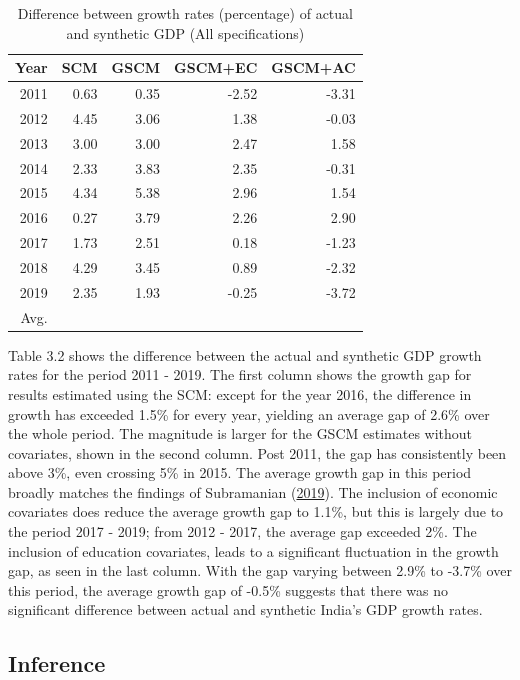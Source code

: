 \documentclass[12pt,nobind, a4paper]{reedthesis}
\begin{document}
 \newrobustcmd{\B}{\bfseries}
 \begin{table}[h!!]
 \centering
 \begin{tabular}{rrrrr}
 \hline
 Year & SCM & GSCM & GSCM+EC & GSCM+AC\\
 \hline
 2011 & 0.63 & 0.35 & -2.52 & -3.31\\
 \hline
 2012 & 4.45 & 3.06 & 1.38 & -0.03\\
 \hline
 2013 & 3.00 & 3.00 & 2.47 & 1.58\\
 \hline
 2014 & 2.33 & 3.83 & 2.35 & -0.31\\
 \hline
 2015 & 4.34 & 5.38 & 2.96 & 1.54\\
 \hline
 2016 & 0.27 & 3.79 & 2.26 & 2.90\\
 \hline
 2017 & 1.73 & 2.51 & 0.18 & -1.23\\
 \hline
 2018 & 4.29 & 3.45 & 0.89 & -2.32\\
 \hline
 2019 & 2.35 & 1.93 & -0.25 & -3.72\\
 \hline
 \B Avg. & \B 2.6 & \B 3.0 & \B 1.1& \B -0.5\\
 \hline
 \end{tabular}
 \caption{Difference between growth rates (percentage) of actual and synthetic GDP (All specifications)}
 \end{table}
 Table 3.2 shows the difference between the actual and synthetic GDP growth rates for the period 2011 - 2019. The first column shows the growth gap for results estimated using the SCM: except for the year 2016, the difference in growth has exceeded 1.5\% for every year, yielding an average gap of 2.6\% over the whole period. The magnitude is larger for the GSCM estimates without covariates, shown in the second column. Post 2011, the gap has consistently been above 3\%, even crossing 5\% in 2015. The average growth gap in this period broadly matches the findings of Subramanian (\protect\hyperlink{ref-subramanian_indias_2019}{2019}). The inclusion of economic covariates does reduce the average growth gap to 1.1\%, but this is largely due to the period 2017 - 2019; from 2012 - 2017, the average gap exceeded 2\%. The inclusion of education covariates, leads to a significant fluctuation in the growth gap, as seen in the last column. With the gap varying between 2.9\% to -3.7\% over this period, the average growth gap of -0.5\% suggests that there was no significant difference between actual and synthetic India's GDP growth rates.

 \hypertarget{inference-1}{%
 \subsection{Inference}\label{inference-1}}
\end{document}
